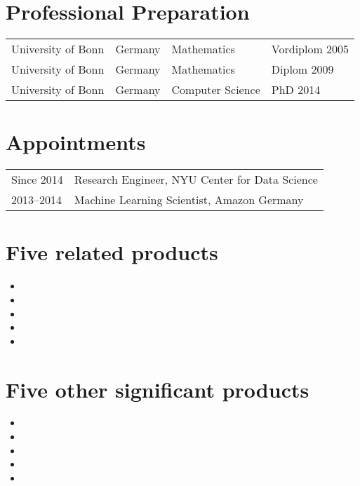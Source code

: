 

\section*{Professional Preparation}
\begin{tabular}{l l l l}
University of Bonn& Germany& Mathematics     &  Vordiplom 2005\\
University of Bonn& Germany& Mathematics     &  Diplom 2009\\
University of Bonn& Germany& Computer Science&  PhD 2014\\
\end{tabular}

\section*{Appointments}
\begin{tabular}{l l}
Since 2014& Research Engineer, NYU Center for Data Science\\
2013--2014& Machine Learning Scientist, Amazon Germany\\
\end{tabular}

\section*{Five related products}
\begin{itemize}
    \item {}  %
    \item {}            %
    \item {} %
    \item {}             %
    \item {}
\end{itemize}
\pagebreak
\section*{Five other significant products}
\begin{itemize}
    \item {}
    \item {}
    \item {}
    \item {}
    \item {}
\end{itemize}

